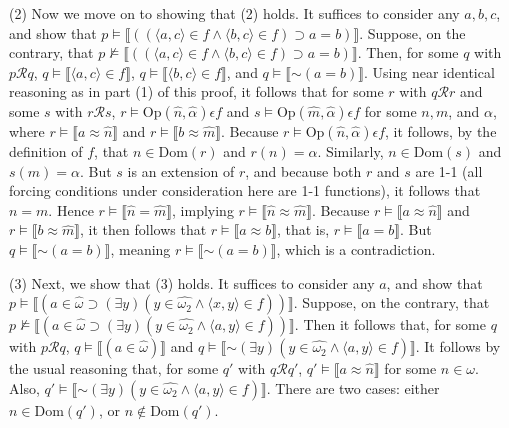 \documentclass{article}
\newcommand*{\oldneg}{\mathord{\sim}}
\newcommand{\lbc}{\llbracket}
\newcommand{\rbc}{\rrbracket}
\theoremstyle{definition}
\begin{document}
(2) Now we move on to showing that (2) holds. It suffices to consider any $a,b,c$, and show that
$p\vDash\lbc((\langle a,c\rangle\in f\wedge\langle b,c\rangle\in f)\supset a=b)\rbc$. Suppose, on the contrary, that 
$p\nvDash\lbc((\langle a,c\rangle\in f\wedge\langle b,c\rangle\in f)\supset a=b)\rbc$. Then, for some $q$ with 
$p\mathcal{R}q$, $q\vDash\lbc\langle a,c\rangle\in f\rbc$, $q\vDash\lbc\langle b,c\rangle\in f\rbc$, 
and $q\vDash\lbc\oldneg(a=b)\rbc$. Using near identical reasoning as in part (1) of this proof, it follows that for 
some $r$ with $q\mathcal{R}r$ and some $s$ with $r\mathcal{R}s$, $r\vDash\textrm{Op}(\hat{n},\hat{\alpha})\epsilon f$ and 
$s\vDash\textrm{Op}(\hat{m},\hat{\alpha})\epsilon f$ for some $n,m$, and $\alpha$, where 
$r\vDash\lbc a\approx\hat{n}\rbc$ and $r\vDash\lbc b\approx\hat{m}\rbc$. Because 
$r\vDash\textrm{Op}(\hat{n},\hat{\alpha})\epsilon f$, it follows, by the definition of $f$, that 
$n\in\textrm{Dom}(r)$ and $r(n)=\alpha$. Similarly, 
$n\in\textrm{Dom}(s)$ and $s(m)=\alpha$. But $s$ is an extension of $r$, and because 
both $r$ and $s$ are 1-1 (all forcing conditions under consideration here are 1-1 functions), 
it follows that $n=m$. Hence $r\vDash\lbc\hat{n}=\hat{m}\rbc$, implying $r\vDash\lbc\hat{n}\approx\hat{m}\rbc$. Because 
$r\vDash\lbc a\approx\hat{n}\rbc$ and $r\vDash\lbc b\approx\hat{m}\rbc$, it then follows that 
$r\vDash\lbc a\approx b\rbc$, that is, $r\vDash\lbc a=b\rbc$. But 
$q\vDash\lbc\oldneg(a=b)\rbc$, meaning $r\vDash\lbc\oldneg(a=b)\rbc$, which is a contradiction.

(3) Next, we show that (3) holds. It suffices to consider any $a$, and show that 
$p\vDash\lbc(a\in\hat{\omega}\supset(\exists y)(y\in\widehat{\omega_2}\wedge\langle x,y\rangle\in f))\rbc$. Suppose, on the 
contrary, that $p\nvDash\lbc(a\in\hat{\omega}\supset(\exists y)(y\in\widehat{\omega_2}\wedge\langle a,y\rangle\in f))\rbc$. Then it 
follows that, for some $q$ with $p\mathcal{R}q$, $q\vDash\lbc(a\in\hat{\omega})\rbc$ and 
$q\vDash\lbc\oldneg(\exists y)(y\in\widehat{\omega_2}\wedge\langle a,y\rangle\in f)\rbc$. It follows by the usual reasoning that, for 
some $q'$ with $q\mathcal{R}q'$, $q'\vDash\lbc a\approx\hat{n}\rbc$ for some $n\in\omega$.
Also, $q'\vDash\lbc\oldneg(\exists y)(y\in\widehat{\omega_2}\wedge\langle a,y\rangle\in f)\rbc$. There are two 
cases: either $n\in\textrm{Dom}(q')$, or $n\notin\textrm{Dom}(q')$.
\end{document}
